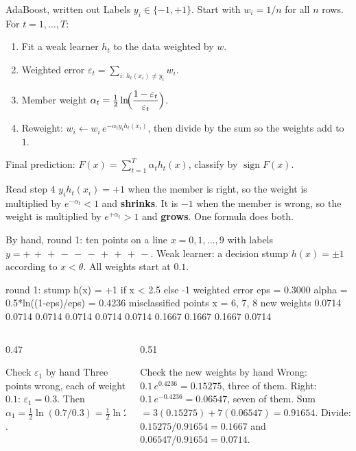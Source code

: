 \documentclass[aspectratio=169]{beamer}
\begin{document}
\begin{frame}[shrink=4]{AdaBoost, written out}
  Labels $y_i \in \{-1, +1\}$. Start with $w_i = 1/n$ for all $n$ rows. For
  $t = 1, \dots, T$:
  \begin{enumerate}
    \item Fit a weak learner $h_t$ to the data weighted by $w$.
    \item Weighted error
      $\displaystyle \varepsilon_t = \sum_{i:\, h_t(x_i) \neq y_i} w_i$.
    \item Member weight
      $\displaystyle \alpha_t
        = \tfrac{1}{2}\ln\!\Bigl(\frac{1-\varepsilon_t}{\varepsilon_t}\Bigr)$.
    \item Reweight: $w_i \leftarrow w_i\,e^{-\alpha_t y_i h_t(x_i)}$,
      then divide by the sum so the weights add to $1$.
  \end{enumerate}
  Final prediction:
  $\displaystyle F(x) = \sum_{t=1}^{T}\alpha_t h_t(x)$, classify by
  $\operatorname{sign} F(x)$.
  \begin{alertblock}{Read step 4}
    $y_i h_t(x_i) = +1$ when the member is right, so the weight is multiplied
    by $e^{-\alpha_t} < 1$ and \textbf{shrinks}. It is $-1$ when the member is
    wrong, so the weight is multiplied by $e^{+\alpha_t} > 1$ and
    \textbf{grows}. One formula does both.
  \end{alertblock}
\end{frame}

\begin{frame}[fragile,shrink=8]{By hand, round 1: ten points on a line}
  $x = 0, 1, \dots, 9$ with labels
  $y = +\,+\,+\,-\,-\,-\,+\,+\,+\,-$. Weak learner: a decision stump
  $h(x) = \pm 1$ according to $x < \theta$. All weights start at $0.1$.
\begin{outblk}
round 1: stump  h(x) = +1 if x < 2.5 else -1
   weighted error  eps = 0.3000
   alpha = 0.5*ln((1-eps)/eps) = 0.4236
   misclassified points x = 6, 7, 8
   new weights 0.0714 0.0714 0.0714 0.0714 0.0714 0.0714 0.1667 0.1667 0.1667 0.0714
\end{outblk}
  \begin{columns}[T]
    \begin{column}{0.47\textwidth}
      \begin{block}{Check $\varepsilon_1$ by hand}
        Three points wrong, each of weight $0.1$: $\varepsilon_1 = 0.3$.
        Then $\alpha_1 = \tfrac12\ln(0.7/0.3) = \tfrac12\ln 2.3333
        = \tfrac12(0.8473) = \mathbf{0.4236}$.
      \end{block}
    \end{column}
    \begin{column}{0.51\textwidth}
      \begin{alertblock}{Check the new weights by hand}
        Wrong: $0.1\,e^{0.4236} = 0.15275$, three of them. Right:
        $0.1\,e^{-0.4236} = 0.06547$, seven of them. Sum
        $= 3(0.15275) + 7(0.06547) = 0.91654$. Divide:
        $0.15275/0.91654 = \mathbf{0.1667}$ and
        $0.06547/0.91654 = \mathbf{0.0714}$.
      \end{alertblock}
    \end{column}
  \end{columns}
\end{frame}
\end{document}
